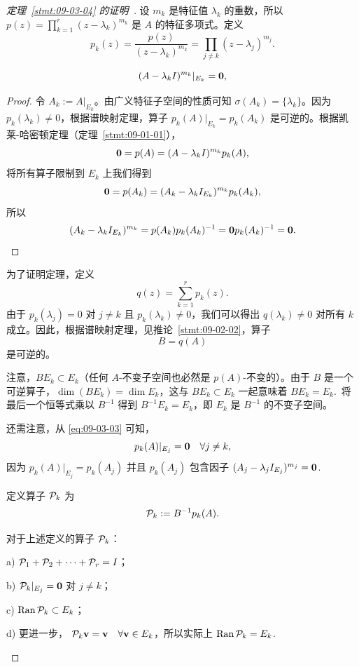 \begin{proof}[\normalfont\heiti 定理~\ref{stmt:09-03-04} 的证明~\nopunct]
设 $m_k$ 是特征值 $\lambda_k$ 的重数，所以 $p(z) = \prod_{k=1}^r (z - \lambda_k)^{m_k}$ 是 $A$ 的特征多项式。定义
$$p_k(z) = \frac{p(z)}{(z - \lambda_k)^{m_k}} = \prod_{j \neq k} (z - \lambda_j)^{m_j}.$$

\begin{lemma}\label{stmt:09-03-06}
\begin{equation}\label{eq:09-03-03}
(A - \lambda_k I)^{m_k}|_{E_k} = \mathbf{0},
\end{equation}\end{lemma}

\begin{proof}令 $A_k:=A|_{E_k}$。由广义特征子空间的性质可知 $\sigma(A_k)=\{\lambda_k\}$。因为 $p_k(\lambda_k)\neq0$，根据谱映射定理，算子 $p_k(A)|_{E_k}=p_k(A_k)$ 是可逆的。根据凯莱-哈密顿定理（定理~\ref{stmt:09-01-01}），
$$\mathbf{0} = p(A) = (A - \lambda_k I)^{m_k} p_k(A),$$
将所有算子限制到 $E_k$ 上我们得到 $$\mathbf{0} = p(A_k) = (A_k - \lambda_k I_{E_k})^{m_k} p_k(A_k),$$
所以
$$(A_k - \lambda_k I_{E_k})^{m_k} = p(A_k) p_k(A_k)^{-1} = \mathbf{0}  p_k(A_k)^{-1} = \mathbf{0}.$$\end{proof}

为了证明定理，定义
$$q(z) = \sum_{k=1}^r p_k(z).$$
由于 $p_k(\lambda_j) = 0$ 对 $j \neq k$ 且 $p_k(\lambda_k) \neq 0$，我们可以得出 $q(\lambda_k) \neq 0$ 对所有 $k$ 成立。因此，根据谱映射定理，见推论~\ref{stmt:09-02-02}，算子
$$B = q(A)$$ 是可逆的。

注意，$BE_k \subset E_k$（任何 $A$-不变子空间也必然是 $p(A)$-不变的）。由于 $B$ 是一个可逆算子，$\dim(BE_k) = \dim E_k$，这与 $BE_k \subset E_k$ 一起意味着 $BE_k = E_k$.~将最后一个恒等式乘以 $B^{-1}$ 得到 $B^{-1}E_k = E_k$，即 $E_k$ 是 $B^{-1}$ 的不变子空间。

还需注意，从 \eqref{eq:09-03-03} 可知，$$p_k(A)|_{E_j} = \mathbf{0} \quad \forall j \neq k,$$
因为 $p_k(A)|_{E_j} = p_k(A_j)$ 并且 $p_k(A_j)$ 包含因子 $(A_j - \lambda_j I_{E_j})^{m_j} = \mathbf{0}$.~

定义算子 $\mathcal{P} _k$ 为 $$\mathcal{P} _k := B^{-1} p_k(A).$$

\begin{lemma}\label{stmt:09-03-07}
对于上述定义的算子 $\mathcal{P} _k$：

a) $\mathcal{P} _1 + \mathcal{P} _2 + \dots + \mathcal{P} _r = I$；

b) $\mathcal{P} _k|_{E_j} = \mathbf{0}$ 对 $j \neq k$；

c) $\operatorname{Ran} \mathcal{P} _k \subset E_k$；

d) 更进一步， $\mathcal{P} _k \mathbf{v} = \mathbf{v} \quad \forall \mathbf{v} \in E_k$，所以实际上 $\operatorname{Ran} \mathcal{P} _k = E_k$.~\end{lemma}


\end{proof}
